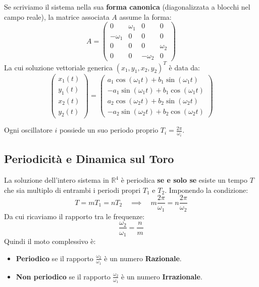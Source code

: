 \documentclass[openany]{book}
\theoremstyle{definition}
\theoremstyle{remark}
\begin{document}
Se scriviamo il sistema nella sua \textbf{forma canonica} (diagonalizzata a blocchi nel campo reale), la matrice associata $A$ assume la forma:
\begin{equation}
    A = \begin{pmatrix}
        0 & \omega_1 & 0 & 0 \\
        -\omega_1 & 0 & 0 & 0 \\
        0 & 0 & 0 & \omega_2 \\
        0 & 0 & -\omega_2 & 0
    \end{pmatrix}
\end{equation}
La cui soluzione vettoriale generica $(x_1, y_1, x_2, y_2)^T$ è data da:
\begin{equation}
    \begin{pmatrix} x_1(t) \\ y_1(t) \\ x_2(t) \\ y_2(t) \end{pmatrix}
    =
    \begin{pmatrix}
        a_1 \cos(\omega_1 t) + b_1 \sin(\omega_1 t) \\
        -a_1 \sin(\omega_1 t) + b_1 \cos(\omega_1 t) \\
        a_2 \cos(\omega_2 t) + b_2 \sin(\omega_2 t) \\
        -a_2 \sin(\omega_2 t) + b_2 \cos(\omega_2 t)
    \end{pmatrix}
\end{equation}

Ogni oscillatore $i$ possiede un suo periodo proprio $T_i = \frac{2\pi}{\omega_i}$.

\subsection{Periodicità e Dinamica sul Toro}
La soluzione dell'intero sistema in $\mathbb{R}^4$ è periodica \textbf{se e solo se} esiste un tempo $T$ che sia multiplo di entrambi i periodi propri $T_1$ e $T_2$. Imponendo la condizione:
\begin{equation}
    T = m T_1 = n T_2 \quad \implies \quad m \frac{2\pi}{\omega_1} = n \frac{2\pi}{\omega_2}
\end{equation}
Da cui ricaviamo il rapporto tra le frequenze:
\begin{equation}
    \frac{\omega_2}{\omega_1} = \frac{n}{m}
\end{equation}
Quindi il moto complessivo è:
\begin{itemize}
    \item \textbf{Periodico} se il rapporto $\frac{\omega_2}{\omega_1}$ è un numero \textbf{Razionale}.
    \item \textbf{Non periodico} se il rapporto $\frac{\omega_2}{\omega_1}$ è un numero \textbf{Irrazionale}.
\end{itemize}
\end{document}
